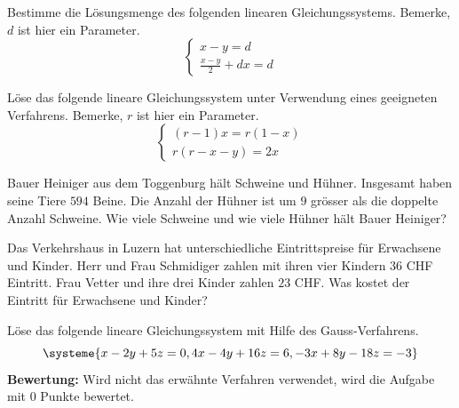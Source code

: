 \documentclass[11pt]{exam}
\begin{document}
\begin{questions}
\question[4] %
Bestimme die Lösungsmenge des folgenden linearen Gleichungssystems. Bemerke, $d$ ist hier ein Parameter.
\[\left\{\begin{matrix}x-y=d\\\frac{x-y}{2}+dx=d\end{matrix}\right.\]


\question[4] %
Löse das folgende lineare Gleichungssystem unter Verwendung eines geeigneten Verfahrens. Bemerke, $r$ ist hier ein Parameter. \[\left\{\begin{matrix}(r-1)x=r(1-x)\\r(r-x-y)=2x\end{matrix}\right.\]


\question[6] %
Bauer Heiniger aus dem Toggenburg hält Schweine und Hühner. Insgesamt haben seine Tiere $594$ Beine. Die Anzahl der Hühner ist um $9$ grösser als die doppelte Anzahl Schweine. Wie viele Schweine und wie viele Hühner hält Bauer Heiniger?


\question[5] %
Das Verkehrshaus in Luzern hat unterschiedliche Eintrittspreise für Erwachsene und Kinder. Herr und Frau Schmidiger zahlen mit ihren vier Kindern $36$ CHF Eintritt. Frau Vetter und ihre drei Kinder zahlen $23$ CHF. Was kostet der Eintritt für Erwachsene und Kinder?

\question[5] %
Löse das folgende lineare Gleichungssystem mit Hilfe des Gauss-Verfahrens.
\[\systeme{x-2y+5z=0,4x-4y+16z=6,-3x+8y-18z=-3}\]
{\small\textbf{Bewertung:} Wird nicht das erwähnte Verfahren verwendet, wird die Aufgabe mit 0 Punkte bewertet.}


\end{questions}
\end{document}

